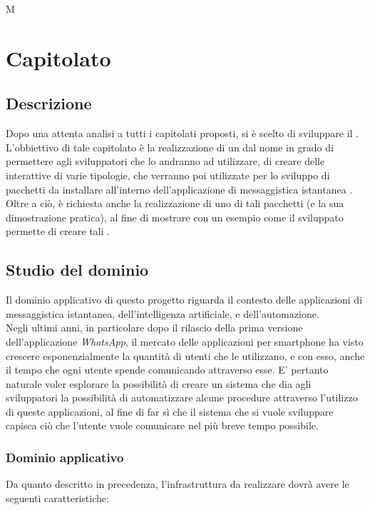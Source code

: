 M\section{Capitolato \capitolato}
\subsection{Descrizione}
Dopo una attenta analisi a tutti i capitolati proposti, si è scelto di sviluppare il  \capitolato. \\
L'obbiettivo di tale capitolato è la realizzazione di un  dal nome \progetto in grado di permettere agli sviluppatori che lo andranno ad utilizzare, di creare delle  interattive di varie tipologie, che verranno poi utilizzate per lo sviluppo di pacchetti da installare all'interno dell'applicazione di messaggistica istantanea . Oltre a ciò, è richiesta anche la realizzazione di uno di tali pacchetti (e la sua dimostrazione pratica), al fine di mostrare con un esempio come il  sviluppato permette di creare tali .

\subsection{Studio del dominio}
Il dominio applicativo di questo progetto riguarda il contesto delle applicazioni di messaggistica istantanea, dell'intelligenza artificiale, e dell'automazione. \\
Negli ultimi anni, in particolare dopo il rilascio della prima versione dell'applicazione \textit{WhatsApp}, il mercato delle applicazioni per smartphone ha visto crescere esponenzialmente la quantità di utenti che le utilizzano, e con esso, anche il tempo che ogni utente spende comunicando attraverso esse. E' pertanto naturale voler esplorare la possibilità di creare un sistema che dia agli sviluppatori la possibilità di automatizzare alcune procedure attraverso l'utilizzo di queste applicazioni, al fine di far sì che il sistema che si vuole sviluppare capisca ciò che l'utente vuole comunicare nel più breve tempo possibile.

\subsubsection{Dominio applicativo}
Da quanto descritto in precedenza, l'infrastruttura da realizzare dovrà avere le seguenti caratteristiche:

